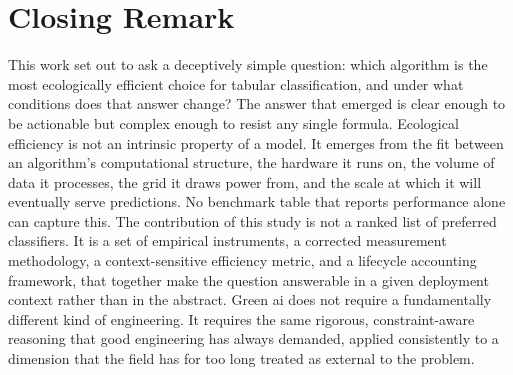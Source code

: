 \section*{Closing Remark}

This work set out to ask a deceptively simple question: which algorithm is the most ecologically efficient choice for tabular classification, and under what conditions does that answer change? The answer that emerged is clear enough to be actionable but complex enough to resist any single formula. Ecological efficiency is not an intrinsic property of a model. It emerges from the fit between an algorithm's computational structure, the hardware it runs on, the volume of data it processes, the grid it draws power from, and the scale at which it will eventually serve predictions. No benchmark table that reports performance alone can capture this. The contribution of this study is not a ranked list of preferred classifiers. It is a set of empirical instruments, a corrected measurement methodology, a context-sensitive efficiency metric, and a lifecycle accounting framework, that together make the question answerable in a given deployment context rather than in the abstract. Green \gls{ai} does not require a fundamentally different kind of engineering. It requires the same rigorous, constraint-aware reasoning that good engineering has always demanded, applied consistently to a dimension that the field has for too long treated as external to the problem.
